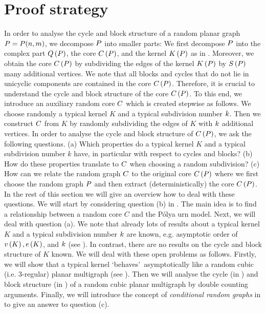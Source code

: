 \section{Proof strategy}\label{CBsec:proof_strategy}
In order to analyse the cycle and block structure of a random planar graph $P=P(n,m)$, we decompose $P$ into smaller parts: We first decompose $P$ into the complex part $Q\left(P\right)$, the core $C\left(P\right)$, and the kernel $K\left(P\right)$ as in . Moreover, we obtain the core $C\left(P\right)$ by subdividing the edges of the kernel $K\left(P\right)$ by $S\left(P\right)$ many additional vertices. We note that all blocks and cycles that do not lie in unicyclic components are contained in the core $C\left(P\right)$. Therefore, it is crucial to understand the cycle and block structure of the core $C\left(P\right)$. To this end, we introduce an auxiliary random core $C$ which is created stepwise as follows. We choose randomly a typical kernel $K$ and a typical subdivision number $k$. Then we construct $C$ from $K$ by randomly subdividing the edges of $K$ with $k$ additional vertices. In order to analyse the cycle and block structure of $C\left(P\right)$, we ask the following questions. (a) Which properties do a typical kernel $K$ and a typical subdivision number $k$ have, in particular with respect to cycles and blocks? 
(b) How do these properties translate to $C$ when choosing a random subdivision? 
(c) How can we relate the random graph $C$ to the original core $C\left(P\right)$ where we first choose the random graph $P$ and then extract (deterministically) the core $C\left(P\right)$. In the rest of this section we will give an overview how to deal with these questions. We will start by considering question (b) in . The main idea is to find a relationship between a random core $C$ and the P\'olya urn model. Next, we will deal with question (a). We note that already lots of results about a typical kernel $K$ and a typical subdivision number $k$ are known, e.g. asymptotic order of $v\left({K}\right), e\left({K}\right)$, and $k$ (see ). In contrast, there are no results on the cycle and block structure of $K$ known. We will deal with these open problems as follows. Firstly, we will show that a typical kernel \lq behaves\rq\ asymptotically like a random cubic (i.e. 3-regular) planar multigraph (see ). Then we will analyse the cycle (in ) and block structure (in ) of a random cubic planar multigraph by double counting arguments. Finally, we will introduce the concept of {\em conditional random graphs} in  to give an answer to question (c).

